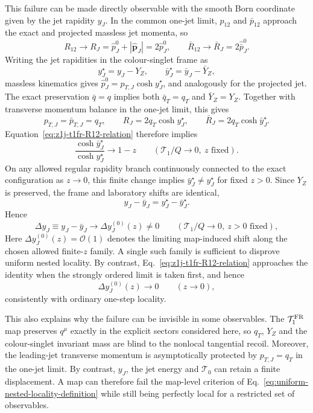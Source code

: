 \documentclass[11pt]{article}
\begin{document}
This failure can be made directly observable with the smooth Born coordinate given by the jet rapidity $y_J$.
In the common one-jet limit, $p_{12}$ and $\bar p_{12}$ approach the exact and projected massless jet momenta,
so
\[
R_{12}\to R_J=\hat p_J^0+|\hat{\boldsymbol p}_J|=2\hat p_J^0,
\qquad
\bar R_{12}\to\bar R_J=2\hat{\bar p}_J^0.
\]
Writing the jet rapidities in the colour-singlet frame as
\[
y_J^\star=y_J-Y_Z,
\qquad
\bar y_J^\star=\bar y_J-\bar Y_Z,
\]
massless kinematics gives \(\hat p_J^0=p_{T,J}\cosh y_J^\star\), and analogously for the projected jet.  The
exact preservation \(\bar q=q\) implies both \(\bar q_T=q_T\) and \(\bar Y_Z=Y_Z\).  Together with transverse
momentum balance in the one-jet limit, this gives
\[
p_{T,J}=\bar p_{T,J}=q_T,
\qquad
R_J=2q_T\cosh y_J^\star,
\qquad
\bar R_J=2q_T\cosh\bar y_J^\star.
\]
Equation~\eqref{eq:z1j-t1fr-R12-relation} therefore implies
\[
\frac{\cosh\bar y_J^\star}{\cosh y_J^\star}
\longrightarrow1-z
\qquad (\mathcal T_1/Q\to0,\ z\text{ fixed}).
\]
On any allowed regular rapidity branch continuously connected to the exact configuration as $z\to0$, this
finite change implies \(\bar y_J^\star\neq y_J^\star\) for fixed $z>0$.  Since \(Y_Z\) is preserved, the
frame and laboratory shifts are identical,
\[
y_J-\bar y_J
=
y_J^\star-\bar y_J^\star.
\]
Hence
\begin{equation}
\boxed{
\Delta y_J
\equiv
y_J-\bar y_J
\longrightarrow
\Delta y_J^{(0)}(z)
\neq0
}
\qquad
(\mathcal T_1/Q\to0,\ z>0\text{ fixed}),
\label{eq:z1j-t1fr-rapidity-shift}
\end{equation}
Here \(\Delta y_J^{(0)}(z)=\mathcal O(1)\) denotes the limiting map-induced shift along the chosen allowed
finite-$z$ family.  A single such family is sufficient to disprove uniform nested locality.  By contrast,
Eq.~\eqref{eq:z1j-t1fr-R12-relation} approaches the identity when the strongly ordered limit is taken first,
and hence
\begin{equation}
\Delta y_J^{(0)}(z)
\longrightarrow0
\qquad (z\to0),
\label{eq:z1j-t1fr-rapidity-strong-ordering}
\end{equation}
consistently with ordinary one-step locality.

This also explains why the failure can be invisible in some observables.  The $\mathcal T_1^{\rm FR}$ map
preserves $q^\mu$ exactly in the explicit sectors considered here, so $q_T$, $Y_Z$ and the colour-singlet
invariant mass are blind to the nonlocal tangential recoil.  Moreover, the leading-jet transverse momentum
is asymptotically protected by $p_{T,J}=q_T$ in the one-jet limit.  By contrast, $y_J$, the jet energy and
$\mathcal T_0$ can retain a finite displacement.  A map can therefore fail the map-level criterion of
Eq.~\eqref{eq:uniform-nested-locality-definition} while still being perfectly local for a restricted set of
observables.
\end{document}
